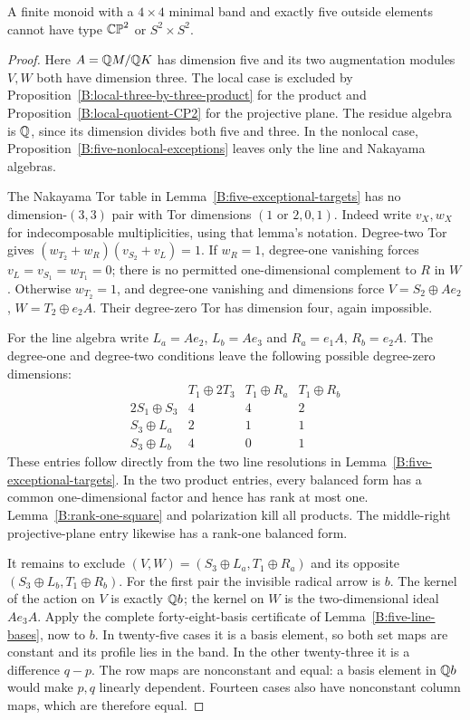 \begin{proposition}\label{B:four-by-four-five-outside}
A finite monoid with a $4\times4$ minimal band and exactly five
outside elements cannot have type $\mathbb {CP}^2$ or $S^2\times S^2$.
\end{proposition}
\begin{proof}
Here $A=\mathbb Q M/\mathbb Q K$ has dimension five and its two augmentation
modules $V,W$ both have dimension three.  The local case is
excluded by Proposition~\ref{B:local-three-by-three-product} for the
product and Proposition~\ref{B:local-quotient-CP2} for the projective
plane.  The residue algebra is $\mathbb Q$, since its dimension divides
both five and three.  In the nonlocal case,
Proposition~\ref{B:five-nonlocal-exceptions} leaves only the line
and Nakayama algebras.

The Nakayama Tor table in Lemma~\ref{B:five-exceptional-targets}
has no dimension-$(3,3)$ pair with Tor dimensions
$(1\text{ or }2,0,1)$.  Indeed write $v_X,w_X$ for indecomposable
multiplicities, using that lemma's notation.  Degree-two Tor gives
$(w_{T_2}+w_R)(v_{S_2}+v_L)=1$.
If $w_R=1$, degree-one vanishing forces $v_L=v_{S_1}=w_{T_1}=0$;
there is no permitted one-dimensional complement to $R$ in $W$.
Otherwise $w_{T_2}=1$, and degree-one vanishing and dimensions force
$V=S_2\oplus Ae_2$, $W=T_2\oplus e_2A$.  Their degree-zero
Tor has dimension four, again impossible.

For the line algebra write $L_a=Ae_2$, $L_b=Ae_3$ and
$R_a=e_1A$, $R_b=e_2A$.  The degree-one and degree-two conditions
leave the following possible degree-zero dimensions:
\[
\begin{array}{c|ccc}
 &T_1\oplus2T_3&T_1\oplus R_a&T_1\oplus R_b\\\hline
2S_1\oplus S_3&4&4&2\\
S_3\oplus L_a&2&1&1\\
S_3\oplus L_b&4&0&1
\end{array}
\]
These entries follow directly from the two line resolutions in
Lemma~\ref{B:five-exceptional-targets}.
In the two product entries, every balanced form has a common
one-dimensional factor and hence has rank at most one.
Lemma~\ref{B:rank-one-square} and polarization kill all products.
The middle-right projective-plane entry likewise has a rank-one
balanced form.

It remains to exclude $(V,W)=(S_3\oplus L_a,T_1\oplus R_a)$
and its opposite $(S_3\oplus L_b,T_1\oplus R_b)$.
For the first pair the invisible radical arrow is $b$.
The kernel of the action on $V$ is exactly $\mathbb Q b$; the kernel
on $W$ is the two-dimensional ideal $Ae_3A$.
Apply the complete forty-eight-basis certificate of
Lemma~\ref{B:five-line-bases}, now to $b$.
In twenty-five cases it is a basis element, so both set maps are
constant and its profile lies in the band.
In the other twenty-three it is a difference $q-p$.
The row maps are nonconstant and equal: a basis element in
$\mathbb Q b$ would make $p,q$ linearly dependent.
Fourteen cases also have nonconstant column maps, which are
therefore equal.


\end{proof}
